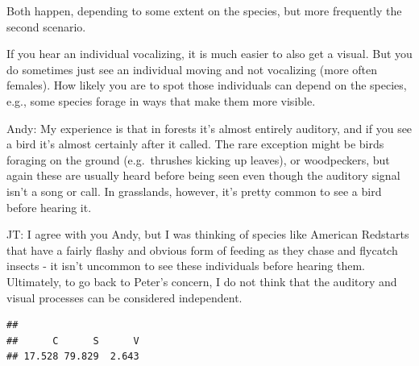 \documentclass[12pt,]{book}
\newenvironment{Shaded}{\begin{snugshade}}{\end{snugshade}}
\newcommand{\CommentTok}[1]{\textcolor[rgb]{0.56,0.35,0.01}{\textit{#1}}}
\newcommand{\DecValTok}[1]{\textcolor[rgb]{0.00,0.00,0.81}{#1}}
\newcommand{\KeywordTok}[1]{\textcolor[rgb]{0.13,0.29,0.53}{\textbf{#1}}}
\newcommand{\NormalTok}[1]{#1}
\newcommand{\OperatorTok}[1]{\textcolor[rgb]{0.81,0.36,0.00}{\textbf{#1}}}
\newcommand{\StringTok}[1]{\textcolor[rgb]{0.31,0.60,0.02}{#1}}
\begin{document}
Both happen, depending to some extent on the species, but more frequently the second scenario.

If you hear an individual vocalizing, it is much easier to also get a visual. But you do sometimes just see an individual moving and not vocalizing (more often females). How likely you are to spot those individuals can depend on the species, e.g., some species forage in ways that make them more visible.

Andy: My experience is that in forests it's almost entirely auditory, and if you see a bird it's almost certainly after it called. The rare exception might be birds foraging on the ground (e.g.~thrushes kicking up leaves), or woodpeckers, but again these are usually heard before being seen even though the auditory signal isn't a song or call. In grasslands, however, it's pretty common to see a bird before hearing it.

JT: I agree with you Andy, but I was thinking of species like American Redstarts that have a fairly flashy and obvious form of feeding as they chase and flycatch insects - it isn't uncommon to see these individuals before hearing them. Ultimately, to go back to Peter's concern, I do not think that the auditory and visual processes can be considered independent.

\begin{Shaded}
\end{Shaded}

\begin{verbatim}
## 
##      C      S      V 
## 17.528 79.829  2.643
\end{verbatim}

\begin{Shaded}
\end{Shaded}
\end{document}
